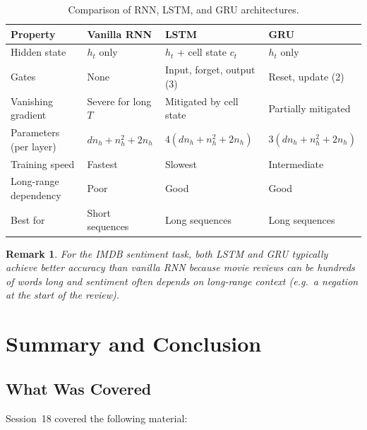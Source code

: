 \documentclass[12pt,a4paper]{article}
\newtheorem{remark}{Remark}[section]
\begin{document}
\begin{table}[ht]
  \centering
  \caption{Comparison of RNN, LSTM, and GRU architectures.}
  \label{tab:rnn_variants}
  \begin{tabularx}{\linewidth}{lXXX}
    \toprule
    \textbf{Property} & \textbf{Vanilla RNN} & \textbf{LSTM} & \textbf{GRU} \\
    \midrule
    Hidden state & $h_t$ only & $h_t$ + cell state $c_t$ & $h_t$ only \\
    \addlinespace
    Gates & None & Input, forget, output (3) & Reset, update (2) \\
    \addlinespace
    Vanishing gradient & Severe for long $T$ & Mitigated by cell state & Partially mitigated \\
    \addlinespace
    Parameters (per layer) & $d n_h + n_h^2 + 2n_h$ & $4(d n_h + n_h^2 + 2n_h)$ & $3(d n_h + n_h^2 + 2n_h)$ \\
    \addlinespace
    Training speed & Fastest & Slowest & Intermediate \\
    \addlinespace
    Long-range dependency & Poor & Good & Good \\
    \addlinespace
    Best for & Short sequences & Long sequences & Long sequences \\
    \bottomrule
  \end{tabularx}
\end{table}

\begin{remark}
  For the IMDB sentiment task, both LSTM and GRU typically achieve
  better accuracy than vanilla RNN because movie reviews can be
  hundreds of words long and sentiment often depends on long-range
  context (e.g.\ a negation at the start of the review).
\end{remark}

\section{Summary and Conclusion}
\label{sec:summary}

\subsection{What Was Covered}
\label{subsec:covered}

Session~18 covered the following material:
\end{document}
